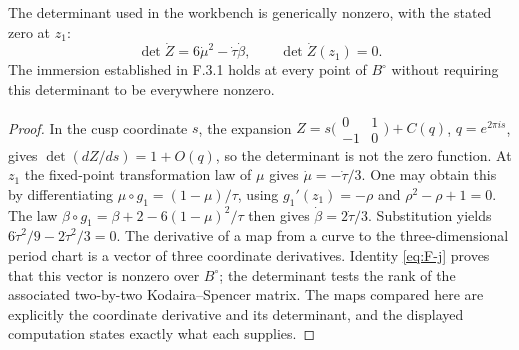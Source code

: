 \begin{proposition}[F.3.3; Proved]\label{st:F.3.3}
The determinant used in the workbench is generically nonzero, with
the stated zero at $z_1$:
\[
 \det\dot Z=6\dot\mu^2-\dot\tau\dot\beta,\qquad
 \det\dot Z(z_1)=0.
\]
The immersion established in F.3.1 holds at every point of $B^\circ$
without requiring this determinant to be everywhere nonzero.
\end{proposition}

\begin{proof}
In the cusp coordinate $s$, the expansion
$Z=s\bigl(\begin{smallmatrix}0&1\\-1&0\end{smallmatrix}\bigr)+C(q)$,
$q=e^{2\pi is}$, gives
$\det(dZ/ds)=1+O(q)$, so the determinant is not the zero function.
At $z_1$ the fixed-point transformation law of $\mu$ gives
$\dot\mu=-\dot\tau/3$.  One may obtain this by differentiating
$\mu\circ g_1=(1-\mu)/\tau$, using
$g_1'(z_1)=-\rho$ and $\rho^2-\rho+1=0$.
The law
$\beta\circ g_1=\beta+2-6(1-\mu)^2/\tau$ then gives
$\dot\beta=2\dot\tau/3$.  Substitution yields
$6\dot\tau^2/9-2\dot\tau^2/3=0$.
The derivative of a map from a curve to the three-dimensional period
chart is a vector of three coordinate derivatives.  Identity
\eqref{eq:F-j} proves that this vector is nonzero over $B^\circ$;
the determinant tests the rank of the associated two-by-two
Kodaira--Spencer matrix.  The maps compared here are explicitly the
coordinate derivative and its determinant, and the displayed computation
states exactly what each supplies.
\end{proof}
